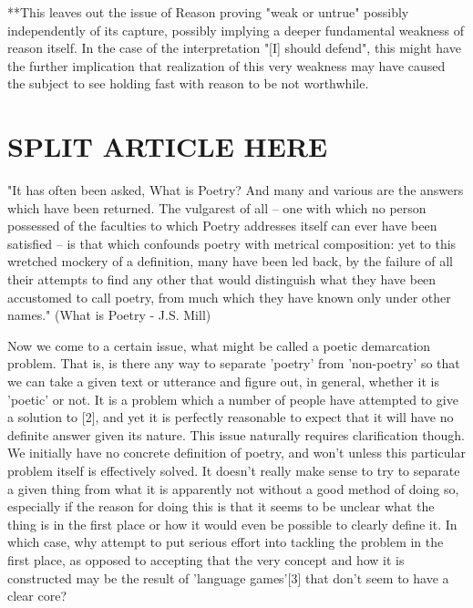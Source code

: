 \documentclass[]{article}
\begin{document}
**This leaves out the issue of Reason proving "weak or untrue" possibly independently of its capture, possibly implying a deeper fundamental weakness of reason itself. In the case of the interpretation "[I] should defend", this might have the further implication that realization of this very weakness may have caused the subject to see holding fast with reason to be not worthwhile.



\section{SPLIT ARTICLE HERE}



"It has often been asked, What is Poetry? And many and various are the answers which have been returned. The vulgarest of all – one with which no person possessed of the faculties to which Poetry addresses itself can ever have been satisfied – is that which confounds poetry with metrical composition: yet to this wretched mockery of a definition, many have been led back, by the failure of all their attempts to find any other that would distinguish what they have been accustomed to call poetry, from much which they have known only under other names." (What is Poetry - J.S. Mill)



Now we come to a certain issue, what might be called a poetic demarcation problem. That is, is there any way to separate 'poetry' from 'non-poetry' so that we can take a given text or utterance and figure out, in general, whether it is 'poetic' or not. It is a problem which a number of people have attempted to give a solution to [2], and yet it is perfectly reasonable to expect that it will have no definite answer given its nature. This issue naturally requires clarification though. We initially have no concrete definition of poetry, and won't unless this particular problem itself is effectively solved. It doesn't really make sense to try to separate a given thing from what it is apparently not without a good method of doing so, especially if the reason for doing this is that it seems to be unclear what the thing is in the first place or how it would even be possible to clearly define it. In which case, why attempt to put serious effort into tackling the problem in the first place, as opposed to accepting that the very concept and how it is constructed may be the result of 'language games'[3] that don't seem to have a clear core?
\end{document}

